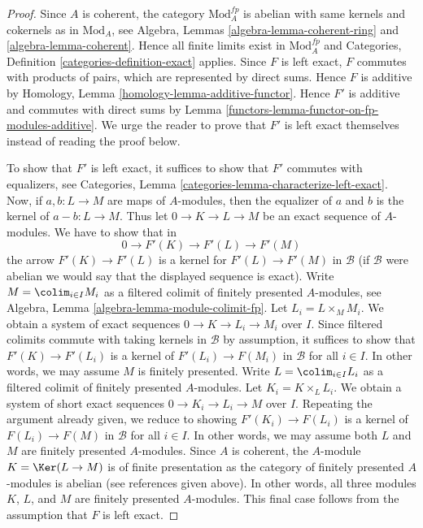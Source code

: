\begin{proof}

Since $A$ is coherent, the category $\text{Mod}^{fp}_A$ is abelian
with same kernels and cokernels as in $\text{Mod}_A$, see
Algebra, Lemmas \ref{algebra-lemma-coherent-ring} and
\ref{algebra-lemma-coherent}. Hence all finite limits exist in
$\text{Mod}^{fp}_A$ and
Categories, Definition \ref{categories-definition-exact} applies.
Since $F$ is left exact, $F$ commutes with products of pairs, which are
represented by direct sums. Hence $F$ is additive by
Homology, Lemma \ref{homology-lemma-additive-functor}.
Hence $F'$ is additive and commutes with direct sums by
Lemma \ref{functors-lemma-functor-on-fp-modules-additive}.
We urge the reader to prove that $F'$ is left exact themselves
instead of reading the proof below.

\medskip\noindent
To show that $F'$ is left exact, it suffices to show that $F'$ commutes
with equalizers, see
Categories, Lemma \ref{categories-lemma-characterize-left-exact}.
Now, if $a, b : L \to M$ are maps of $A$-modules, then the
equalizer of $a$ and $b$ is the kernel of $a - b : L \to M$.
Thus let $0 \to K \to L \to M$ be an exact sequence
of $A$-modules. We have to show that in
$$
0 \to F'(K) \to F'(L) \to F'(M)
$$
the arrow $F'(K) \to F'(L)$ is a kernel for $F'(L) \to F'(M)$ in $\mathcal{B}$
(if $\mathcal{B}$ were abelian we would say that the displayed sequence
is exact).
Write $M = \colim_{i \in I} M_i$ as a filtered colimit of finitely
presented $A$-modules, see
Algebra, Lemma \ref{algebra-lemma-module-colimit-fp}.
Let $L_i = L \times_M M_i$.
We obtain a system of exact sequences $0 \to K \to L_i \to M_i$
over $I$. Since filtered colimits commute with taking kernels
in $\mathcal{B}$ by assumption,
it suffices to show that $F'(K) \to F'(L_i)$ is a kernel of
$F'(L_i) \to F(M_i)$ in $\mathcal{B}$ for all $i \in I$. In other words, we may
assume $M$ is finitely presented. Write $L = \colim_{i \in I} L_i$
as a filtered colimit of finitely presented $A$-modules.
Let $K_i = K \times_L L_i$. We obtain a system of short exact sequences
$0 \to K_i \to L_i \to M$ over $I$.
Repeating the argument already given, we reduce to showing
$F'(K_i) \to F(L_i)$ is a kernel of
$F(L_i) \to F(M)$ in $\mathcal{B}$ for all $i \in I$.
In other words, we may assume both
$L$ and $M$ are finitely presented $A$-modules.
Since $A$ is coherent, the $A$-module $K = \Ker(L \to M)$ is
of finite presentation as the category of finitely presented
$A$-modules is abelian (see references given above).
In other words, all three modules $K$, $L$, and $M$
are finitely presented $A$-modules. This final case follows
from the assumption that $F$ is left exact.
\end{proof}

